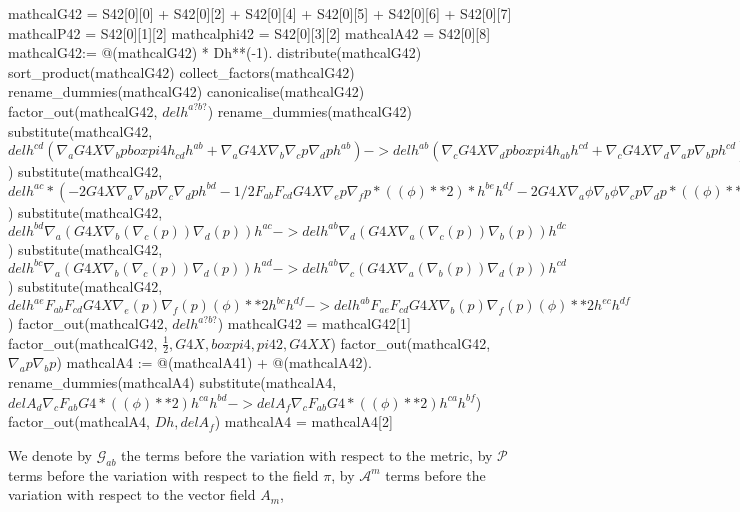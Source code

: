 \documentclass[10pt]{article}
\begin{document}
\begin{python}
mathcalG42 = S42[0][0] + S42[0][2] + S42[0][4] + S42[0][5] + S42[0][6] + S42[0][7]
mathcalP42 = S42[0][1][2]
mathcalphi42 = S42[0][3][2]
mathcalA42 = S42[0][8]
mathcalG42:= @(mathcalG42) * Dh**(-1).
distribute(mathcalG42)
sort_product(mathcalG42)
collect_factors(mathcalG42)
rename_dummies(mathcalG42)
canonicalise(mathcalG42)
factor_out(mathcalG42, $delh^{a? b?}$)
rename_dummies(mathcalG42)
substitute(mathcalG42, $delh^{c d} (\nabla_{a}{G4X \nabla_{b}{p} boxpi4} h_{c d} h^{a b} + \nabla_{a}{G4X \nabla_{b}{\nabla_{c}{p}} \nabla_{d}{p}} h^{a b}) -> delh^{a b} (\nabla_{c}{G4X \nabla_{d}{p} boxpi4} h_{a b} h^{c d} + \nabla_{c}{G4X \nabla_{d}{\nabla_{a}{p}} \nabla_{b}{p}} h^{c d})$)
substitute(mathcalG42, $delh^{a c} * (-2G4X \nabla_{a}{\nabla_{b}{p}} \nabla_{c}{\nabla_{d}{p}} h^{b d} -  1/2 F_{a b} F_{c d} G4X \nabla_{e}{p} \nabla_{f}{p} * ((\phi)**2) * h^{b e} h^{d f}-2G4X \nabla_{a}{\phi} \nabla_{b}{\phi} \nabla_{c}{p} \nabla_{d}{p} * ((\phi)**(-2)) * h^{b d}) -> delh^{a b} * (-2G4X \nabla_{a}{\nabla_{c}{p}} \nabla_{b}{\nabla_{d}{p}} h^{c d} -  1/2 F_{a c} F_{b d} G4X \nabla_{e}{p} \nabla_{f}{p}* ((\phi)**2) * h^{c e} h^{d f}-2G4X \nabla_{a}{\phi} \nabla_{c}{\phi} \nabla_{b}{p} \nabla_{d}{p} * ((\phi)**(-2)) * h^{c d})$)
substitute(mathcalG42, $delh^{b d} \nabla_{a}(G4X \nabla_{b}(\nabla_{c}(p)) \nabla_{d}(p)) h^{a c} -> delh^{a b} \nabla_{d}(G4X \nabla_{a}(\nabla_{c}(p)) \nabla_{b}(p)) h^{d c}$)
substitute(mathcalG42, $delh^{b c} \nabla_{a}(G4X \nabla_{b}(\nabla_{c}(p)) \nabla_{d}(p)) h^{a d} -> delh^{a b} \nabla_{c}(G4X \nabla_{a}(\nabla_{b}(p)) \nabla_{d}(p)) h^{c d}$)
substitute(mathcalG42, $delh^{a e} F_{a b} F_{c d} G4X \nabla_{e}(p) \nabla_{f}(p) (\phi)**2 h^{b c} h^{d f} -> delh^{a b} F_{a e} F_{c d} G4X \nabla_{b}(p) \nabla_{f}(p) (\phi)**2 h^{e c} h^{d f}$)
factor_out(mathcalG42, $delh^{a? b?}$)
mathcalG42 = mathcalG42[1]
factor_out(mathcalG42, $\frac{1}{2}, G4X, boxpi4, pi42, G4XX$)
factor_out(mathcalG42, $\nabla_{a}{p}\nabla_{b}{p}$)
mathcalA4 := @(mathcalA41) + @(mathcalA42).
rename_dummies(mathcalA4)
substitute(mathcalA4, $delA_{d}\nabla_{c}{F_{a b} G4 *((\phi)**2)}h^{c a} h^{b d} -> delA_{f}\nabla_{c}{F_{a b} G4 *((\phi)**2)}h^{c a} h^{b f}$)
factor_out(mathcalA4, $Dh, delA_{f}$)
mathcalA4 = mathcalA4[2]
\end{python}
We denote by $\mathcal{G}_{a b}$ the terms before the variation with respect to the metric, by $\mathcal{P}$ terms before the variation with respect to the field $\pi$, by $\mathcal{A}^{m}$ terms before the variation with respect to the vector field $A_{m}$, 
\end{document}
